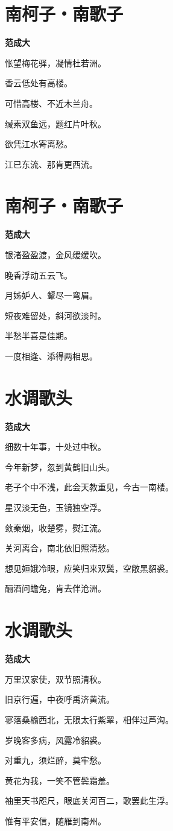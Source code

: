 \documentclass[12pt,a4paper]{ctexbook}
\begin{document}
\section{南柯子・南歌子}
\textbf{范成大}\par\vspace{0.5em}
怅望梅花驿，凝情杜若洲。\par
香云低处有高楼。\par
可惜高楼、不近木兰舟。\par
缄素双鱼远，题红片叶秋。\par
欲凭江水寄离愁。\par
江已东流、那肯更西流。\par

\section{南柯子・南歌子}
\textbf{范成大}\par\vspace{0.5em}
银渚盈盈渡，金风缓缓吹。\par
晚香浮动五云飞。\par
月姊妒人、颦尽一弯眉。\par
短夜难留处，斜河欲淡时。\par
半愁半喜是佳期。\par
一度相逢、添得两相思。\par

\section{水调歌头}
\textbf{范成大}\par\vspace{0.5em}
细数十年事，十处过中秋。\par
今年新梦，忽到黄鹤旧山头。\par
老子个中不浅，此会天教重见，今古一南楼。\par
星汉淡无色，玉镜独空浮。\par
敛秦烟，收楚雾，熨江流。\par
关河离合，南北依旧照清愁。\par
想见姮娥冷眼，应笑归来双鬓，空敞黑貂裘。\par
酾酒问蟾兔，肯去伴沧洲。\par

\section{水调歌头}
\textbf{范成大}\par\vspace{0.5em}
万里汉家使，双节照清秋。\par
旧京行遍，中夜呼禹济黄流。\par
寥落桑榆西北，无限太行紫翠，相伴过芦沟。\par
岁晚客多病，风露冷貂裘。\par
对重九，须烂醉，莫牢愁。\par
黄花为我，一笑不管鬓霜羞。\par
袖里天书咫尺，眼底关河百二，歌罢此生浮。\par
惟有平安信，随雁到南州。\par
\end{document}
